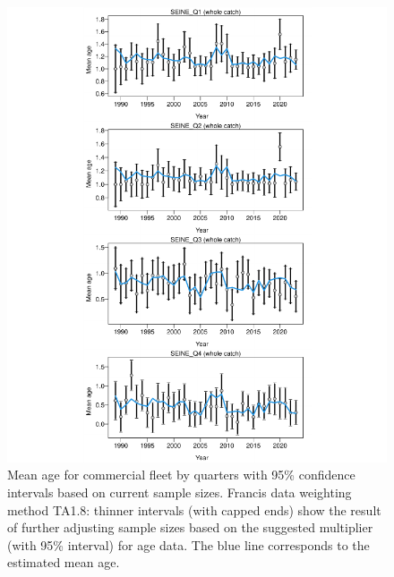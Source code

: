 \documentclass[
]{article}
\begin{document}
\begin{figure}[H]

{\centering \includegraphics[width=0.95\linewidth]{Report_SS3_quarter_with_age_data_S1.0_4FLEETS_files/figure-latex/unnamed-chunk-16-1} 

}

\caption{Mean age for commercial fleet by quarters with 95\% confidence intervals based on current sample sizes. Francis data weighting method TA1.8: thinner intervals (with capped ends) show the result of further adjusting sample sizes based on the suggested multiplier (with 95\% interval) for age data. The blue line corresponds to the estimated mean age.}\label{fig:unnamed-chunk-16}
\end{figure}
\end{document}
